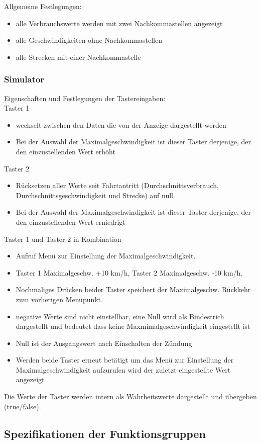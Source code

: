 \documentclass[a4paper,12pt]{article}
\begin{document}
Allgemeine Festlegungen:

\begin{itemize}

	\item alle Verbrauchswerte werden mit zwei Nachkommastellen angezeigt
	\item alle Geschwindigkeiten ohne Nachkommastellen
	\item alle Strecken mit einer Nachkommastelle

\end{itemize}

\subsubsection{Simulator}

Eigenschaften und Festlegungen der Tastereingaben:\\

Taster 1
\begin{itemize}

	\item wechselt zwischen den Daten die von der Anzeige dargestellt werden
	\item Bei der Auswahl der Maximalgeschwindigkeit ist dieser Taster derjenige, der den einzustellenden Wert erhöht

\end{itemize}

Taster 2
\begin{itemize}

	\item Rücksetzen aller Werte seit Fahrtantritt (Durchschnittsverbrauch, Durchschnittsgeschwindigkeit und Strecke) auf null
	\item Bei der Auswahl der Maximalgeschwindigkeit ist dieser Taster derjenige, der den einzustellenden Wert erniedrigt
	
\end{itemize}

Taster 1 und Taster 2 in Kombination
\begin{itemize}

	\item Aufruf Menü zur Einstellung der Maximalgeschwindigkeit.
	\item Taster 1 Maximalgeschw. +10 km/h, Taster 2 Maximalgeschw. -10 km/h.
	\item Nochmaliges Drücken beider Taster speichert der Maximalgeschw. Rückkehr zum vorherigen Menüpunkt.
	\item negative Werte sind nicht einstellbar, eine Null wird als Bindestrich dargestellt und bedeutet dass keine Maxmimalgeschwindigkeit eingestellt ist
	\item Null ist der Ausgangswert nach Einschalten der Zündung
	\item Werden beide Taster erneut betätigt um das Menü zur Einstellung der Maximalgeschwindigkeit aufzurufen wird der zuletzt eingestellte Wert angezeigt
	
\end{itemize}

Die Werte der Taster werden intern als Wahrheitswerte dargestellt und übergeben (true/false).

\subsection{Spezifikationen der Funktionsgruppen}
\end{document}
